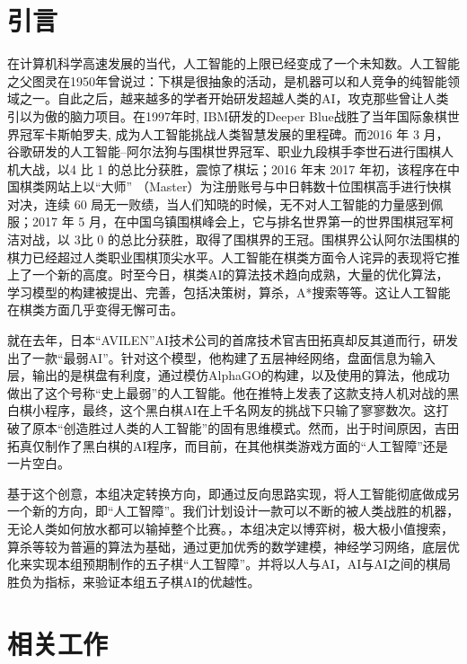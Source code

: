 \documentclass[a4paper]{article}
\begin{document}
  \begin{multicols}{2}
  \section{引言}
  在计算机科学高速发展的当代，人工智能的上限已经变成了一个未知数。人工智能之父图灵在1950年曾说过：下棋是很抽象的活动，是机器可以和人竞争的纯智能领域之一。\cite{ref1}自此之后，越来越多的学者开始研发超越人类的AI，攻克那些曾让人类引以为傲的脑力项目。在1997年时, IBM研发的Deeper Blue战胜了当年国际象棋世界冠军卡斯帕罗夫, 成为人工智能挑战人类智慧发展的里程碑。\cite{b1}而2016 年 3 月，谷歌研发的人工智能–阿尔法狗与围棋世界冠军、职业九段棋手李世石进行围棋人机大战，以4 比 1 的总比分获胜，震惊了棋坛；2016 年末 2017 年初，该程序在中国棋类网站上以“大师” （Master）为注册账号与中日韩数十位围棋高手进行快棋对决，连续 60 局无一败绩，当人们知晓的时候，无不对人工智能的力量感到佩服；2017 年 5 月，在中国乌镇围棋峰会上，它与排名世界第一的世界围棋冠军柯洁对战，以 3比 0 的总比分获胜，取得了围棋界的王冠。围棋界公认阿尔法围棋的棋力已经超过人类职业围棋顶尖水平。\cite{b3}人工智能在棋类方面令人诧异的表现将它推上了一个新的高度。时至今日，棋类AI的算法技术趋向成熟，大量的优化算法，学习模型的构建被提出、完善，包括决策树，算杀，A*搜索等等。这让人工智能在棋类方面几乎变得无懈可击。\cite{b2} \par
就在去年，日本“AVILEN”AI技术公司的首席技术官吉田拓真却反其道而行，研发出了一款“最弱AI”。针对这个模型，他构建了五层神经网络，盘面信息为输入层，输出的是棋盘有利度，通过模仿AlphaGO的构建，以及使用的算法，他成功做出了这个号称“史上最弱”的人工智能。他在推特上发表了这款支持人机对战的黑白棋小程序，最终，这个黑白棋AI在上千名网友的挑战下只输了寥寥数次。这打破了原本“创造胜过人类的人工智能”的固有思维模式。然而，出于时间原因，吉田拓真仅制作了黑白棋的AI程序\cite{ref2}，而目前，在其他棋类游戏方面的“人工智障”还是一片空白。\par
基于这个创意，本组决定转换方向，即通过反向思路实现，将人工智能彻底做成另一个新的方向，即“人工智障”。我们计划设计一款可以不断的被人类战胜的机器，无论人类如何放水都可以输掉整个比赛。，本组决定以博弈树，极大极小值搜索，算杀等较为普遍的算法为基础，通过更加优秀的数学建模，神经学习网络，底层优化来实现本组预期制作的五子棋“人工智障”。并将以人与AI，AI与AI之间的棋局胜负为指标，来验证本组五子棋AI的优越性。
  \section{相关工作}

\end{multicols}
\end{document}

